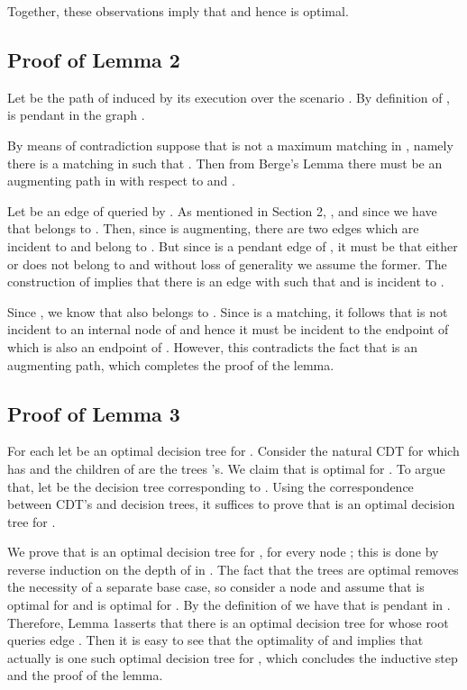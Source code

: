 \documentclass[12pt]{article}
\newcommand{\prelim}[0]{2}
\newcommand{\pendantFirst}[0]{1}
\begin{document}
		Together, these observations imply that  and hence  is optimal.
	

	\subsection{Proof of Lemma 2}
	


Let  be the path of  induced by its execution over the scenario . By definition of ,  is pendant in the graph .
		
		By means of contradiction suppose that  is not a maximum matching in , namely there is a matching  in  such that . Then from Berge's Lemma \cite{lovasz} there must be an augmenting path  in  with respect to  and .
		
		Let  be an edge of  queried by . As mentioned in Section \prelim, , and since  we have that  belongs to . Then, since  is augmenting, there are two edges  which are incident to  and belong to . But since  is a pendant edge of , it must be that either  or  does not belong to  and without loss of generality we assume the former. The construction of  implies that there is an edge  with  such that  and  is incident to . 
		
		Since , we know that  also belongs to . Since  is a matching, it follows that  is not incident to an internal node of  and hence it must be incident to the endpoint of  which is also an endpoint of . However, this contradicts the fact that  is an augmenting path, which completes the proof of the lemma.




	\subsection{Proof of Lemma 3} 

		For each  let  be an optimal decision tree for . Consider the natural CDT  for  which has  and the children of  are the trees 's. We claim that  is optimal for . To argue that, let  be the decision tree corresponding to . Using the correspondence between CDT's and decision trees, it suffices to prove that  is an optimal decision tree for . 		
		
		We prove that  is an optimal decision tree for , for every node ; this is done by reverse induction on the depth of  in . The fact that the trees  are optimal removes the necessity of a separate base case, so consider a node  and assume that  is optimal for  and  is optimal for . By the definition of  we have that  is pendant in . Therefore, Lemma \pendantFirst asserts that there is an optimal decision tree for  whose root queries edge . Then it is easy to see that the optimality of  and  implies that actually  is one such optimal decision tree for , which concludes the inductive step and the proof of the lemma.
\end{document}
